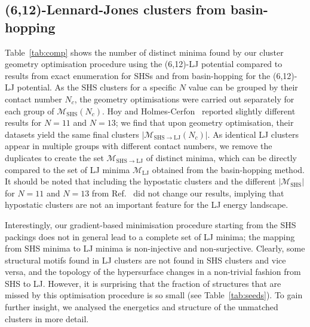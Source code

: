 \subsection{(6,12)-Lennard-Jones clusters from basin-hopping} 

Table~\ref{tab:comp} shows the number of distinct minima found by our cluster
geometry optimisation procedure using the (6,12)-LJ potential compared to
results from exact enumeration for \ac{SHS}s and from basin-hopping for the (6,12)-LJ
potential.  As the \ac{SHS} clusters for a specific $N$ value can be grouped by
their contact number $N_c$, the geometry optimisations were carried out
separately for each group of $\mathcal{M}_\mathrm{SHS}(N_c)$. Hoy
\autocite{Hoy_Structurefinitesphere_2012,Hoy_Structuredynamicsmodel_2015} and Holmes-Cerfon~\autocite{Holmes-Cerfon_EnumeratingRigidSphere_2016}  reported
slightly different results
for $N=11$ and $N=13$; we find that upon geometry optimisation,
their datasets yield the same final clusters
$|\mathcal{M}_{\mathrm{SHS\to LJ}}(N_c)|$.  As identical LJ clusters appear in
multiple groups with different contact numbers, we remove the duplicates to
create the set $\mathcal{M}_\mathrm{SHS\to LJ}$ of distinct minima, which can
be directly compared to the set of LJ minima $\mathcal{M}_\mathrm{LJ}$ obtained
from the basin-hopping method. It should be noted that including the hypostatic
clusters and the different $|\mathcal{M}_\mathrm{SHS}|$ for $N=11$ and $N=13$
from Ref.~\autocite{Holmes-Cerfon_EnumeratingRigidSphere_2016} did not change our results, implying that hypostatic
clusters are not an important feature for the LJ energy landscape. 


Interestingly, our gradient-based minimisation procedure starting from the \ac{SHS}
packings does not in general lead to a complete set of LJ minima; the mapping
from \ac{SHS} minima to LJ minima is non-injective and non-surjective.  Clearly,
some structural motifs found in LJ clusters are not found in \ac{SHS} clusters and
vice versa, and the topology of the hypersurface changes in a non-trivial
fashion from \ac{SHS} to LJ.  However, it is surprising that the fraction of
structures that are missed by this optimisation procedure is so small (see
Table~\ref{tab:seeds}). To gain further insight, we analysed the energetics and
structure of the unmatched clusters in more detail.

